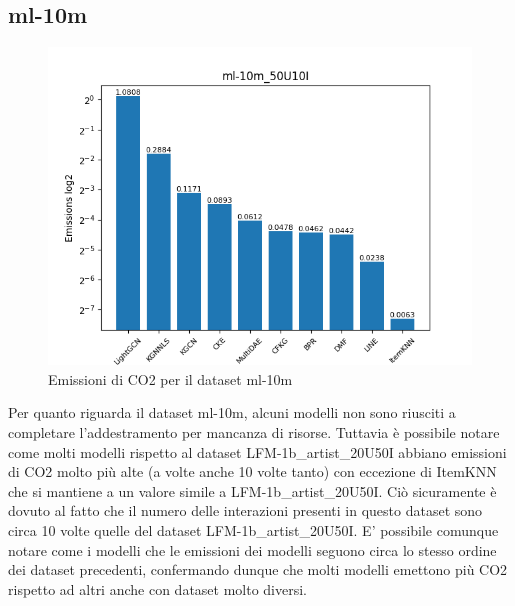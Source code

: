 \subsection{ml-10m}

\begin{figure}[H]
    \centering
    \includegraphics[scale=0.75]{images/emissions_ml-10m_50U10I.png}
    \caption{Emissioni di CO2 per il dataset ml-10m}
\end{figure}

Per quanto riguarda il dataset ml-10m, alcuni modelli non sono riusciti a completare l'addestramento per mancanza di risorse.
Tuttavia è possibile notare come molti modelli rispetto al dataset LFM-1b\_artist\_20U50I abbiano emissioni di CO2 molto più alte (a volte anche 10 volte tanto) con eccezione di ItemKNN che si mantiene a un valore simile a LFM-1b\_artist\_20U50I.
Ciò sicuramente è dovuto al fatto che il numero delle interazioni presenti in questo dataset sono circa 10 volte quelle del dataset LFM-1b\_artist\_20U50I.
E' possibile comunque notare come i modelli che le emissioni dei modelli seguono circa lo stesso ordine dei dataset precedenti, confermando dunque che molti modelli emettono più CO2 rispetto ad altri anche con dataset molto diversi.





